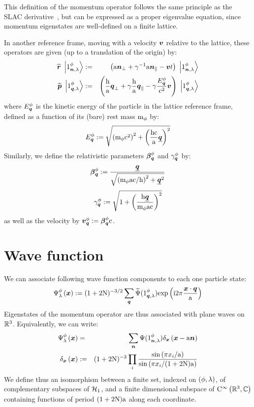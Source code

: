 \documentclass[10pt,a4paper,twoside,openany]{book}
\begin{document}
 This definition of the momentum operator follows the same principle as the SLAC derivative~\cite{Rabin1981}, but can be expressed as a proper eigenvalue equation, since momentum eigenstates are well-defined on a finite lattice.

 In another reference frame, moving with a velocity $\boldsymbol{v}$ relative to the lattice, these operators are given (up to a translation of the origin) by:
\begin{eqnarray*}
\widehat{\boldsymbol{r}} \ \left|{{1}^{\phi}_{{\boldsymbol{n}}, {\lambda}}}\right\rangle & := & \left( \mathrm a \boldsymbol{n}_\perp + \gamma^{-1} \mathrm a  \boldsymbol{n}_\parallel - \boldsymbol{v} t \right) \ \left|{{1}^{\phi}_{{\boldsymbol{n}}, {\lambda}}}\right\rangle \\
\widehat{\boldsymbol{p}} \ \left|{{1}^{\phi}_{{\boldsymbol{q}}, {\lambda}}}\right\rangle & := & \left( \frac {\mathrm h} {\mathrm a} \boldsymbol{q}_\perp + \gamma \frac {\mathrm h} {\mathrm a} \boldsymbol{q}_\parallel - \gamma \frac {E^{\phi}_{\boldsymbol{q}}} {\mathrm c^2} \boldsymbol{v} \right) \ \left|{{1}^{\phi}_{{\boldsymbol{q}}, {\lambda}}}\right\rangle
\end{eqnarray*}
where $E^{\phi}_{\boldsymbol{q}}$ is the kinetic energy of the particle in the lattice reference frame, defined as a function of its (bare) rest mass $\mathrm m_{\phi}$ by:
\begin{equation*}
E^{\phi}_{\boldsymbol{q}} := \sqrt{\left( \mathrm m_{\phi} \mathrm c^2 \right)^2 + \left( \frac{\mathrm h \mathrm c}{\mathrm a} \underline{\boldsymbol{q}} \right)^2}
\end{equation*}
Similarly, we define the relativistic parameters $\boldsymbol{\beta}^{\phi}_{\boldsymbol{q}}$ and $\gamma^{\phi}_{\boldsymbol{q}}$ by:
\begin{equation*}
\boldsymbol{\beta}^{\phi}_{\boldsymbol{q}} := \frac{\underline{\boldsymbol{q}}}{\sqrt{\left( \mathrm m_{\phi} \mathrm a \mathrm c / \mathrm h \right)^2 + \underline{\boldsymbol{q}}^2}}
\end{equation*}
\begin{equation*}
\gamma^{\phi}_{\boldsymbol{q}} := \sqrt{1 + \left( \frac{\mathrm h \underline{\boldsymbol{q}}}{\mathrm m_{\phi} \mathrm a \mathrm c} \right)^2}
\end{equation*}
as well as the velocity by $\boldsymbol{v}^{\phi}_{\boldsymbol{q}} := \boldsymbol{\beta}^{\phi}_{\boldsymbol{q}} \mathrm c$.

\section{Wave function}

 We can associate following wave function components to each one particle state:
\begin{equation*}
{\Psi}^{\phi}_{\lambda}\left({\boldsymbol{x}}\right) := (1+2 \mathrm N)^{-3/2} \sum_{\boldsymbol{q}} \widetilde{\Psi}({1}^{\phi}_{{\boldsymbol{q}}, {\lambda}}) \mathrm{exp} \left( {\mathrm{i} 2 \pi \frac{\boldsymbol{x} \cdot \boldsymbol{q}}{\mathrm a}} \right)
\end{equation*}
Eigenstates of the momentum operator are thus associated with plane waves on $\mathbb{R}^3$. Equivalently, we can write:
\begin{eqnarray*}
{\Psi}^{\phi}_{\lambda}\left({\boldsymbol{x}}\right) & = & \sum_{\boldsymbol{n}} \Psi({1}^{\phi}_{{\boldsymbol{n}}, {\lambda}}) \delta_{\boldsymbol{x}} \left({\boldsymbol{x} - \mathrm a \boldsymbol{n}}\right) \\
\delta_{\boldsymbol{x}} \left({\boldsymbol{x}}\right) & := & (1+2 \mathrm N)^{-3} \prod_i \frac{\mathrm{sin} \left( {\pi {x}_{i} / \mathrm a} \right)}{\mathrm{sin} \left( {\pi {x}_{i} / (1+2 \mathrm N)\mathrm a} \right)}
\end{eqnarray*}
We define thus an isomorphism between a finite set, indexed on $( \phi,\lambda )$, of complementary subspaces of $\mathcal H_{1}$, and a finite dimensional subspace of $\mathrm C^\infty\left(\mathbb{R}^3,\mathbb{C}\right)$ containing functions of period $(1+2\mathrm N)\mathrm a$ along each coordinate.
\end{document}

